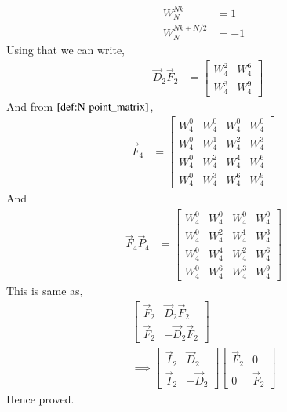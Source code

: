\documentclass[journal,12pt,twocolumn]{IEEEtran}
\renewcommand\thesection{\arabic{section}}
\begin{document}
\begin{enumerate}[label=\arabic*.,ref=\thesection.\theenumi]
\begin{align}
       W_{N}^{Nk} &= 1 \label{result_1}\\
       W_{N}^{Nk + N/2} &= -1\label{result_2}
     \end{align}
    Using that we can write,
      \begin{align}
        -\vec{D}_2\vec{F}_2 &= \begin{bmatrix}
                               W_4^{2} & W_4^{6} \\
                               W_4^{3} & W_4^{9}
                               \end{bmatrix}
      \end{align}
    And from $\eqref{def:N-point_matrix}$,
       \begin{align}
         \vec{F}_{4} &= \begin{bmatrix}
                        W_4^0 &  W_4^0& W_4^0 & W_4^0  \\
                        W_4^0 & W_4^1 & W_4^2 & W_4^3  \\
                        W_4^0 & W_4^2 & W_4^4 &  W_4^6 \\
                        W_4^0 & W_4^3 & W_4^6 & W_4^9   
                        \end{bmatrix}
       \end{align}
    And 
       \begin{align}
         \vec{F}_{4}\vec{P}_{4} &= \begin{bmatrix}
                                   W_4^0 &  W_4^0& W_4^0 & W_4^0 \\
                                  W_4^0 & W_4^2 & W_4^1 & W_4^3  \\
                                  W_4^0 & W_4^4 & W_4^2 &  W_4^6 \\
                                  W_4^0 & W_4^6 & W_4^3 & W_4^9       
                                   \end{bmatrix}
       \end{align} 
      This is same as,
            \begin{align}
              \begin{bmatrix}
                \vec{F}_{2} & \vec{D}_{2}\vec{F}_{2} \\
                \vec{F}_{2} & -\vec{D}_{2}\vec{F}_{2}
              \end{bmatrix}\\
            \implies \begin{bmatrix}
              \vec{I}_{2} & \vec{D}_{2} \\
              \vec{I}_{2} & -\vec{D}_{2}
            \end{bmatrix}
            \begin{bmatrix}
              \vec{F}_{2} & 0 \\
              0 & \vec{F}_{2}   
            \end{bmatrix}   
            \end{align} 
        Hence proved.
          

\end{enumerate}
\end{document}
